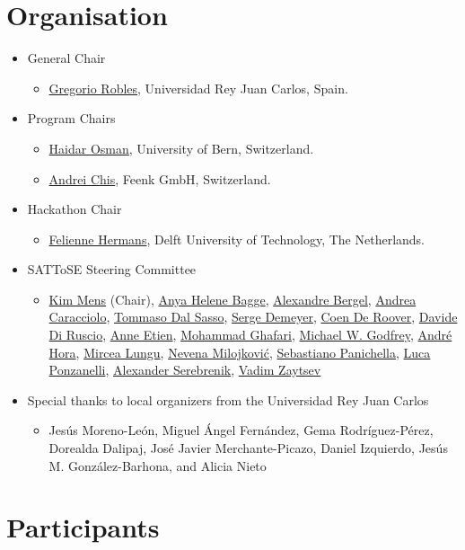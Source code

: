 \documentclass[12pt]{article}
\begin{document}
\section*{Organisation}
\begin{itemize}
 \item General Chair
 \begin{itemize}
  \item \href{https://gsyc.urjc.es/~grex/}{Gregorio Robles}, Universidad Rey Juan Carlos, Spain.
 \end{itemize}
 \item Program Chairs
 \begin{itemize}
  \item \href{http://scg.unibe.ch/staff/osman}{Haidar Osman}, University of Bern, Switzerland.
  \item \href{http://scg.unibe.ch/staff/andreichis}{Andrei Chis}, Feenk GmbH, Switzerland.
 \end{itemize}
 \item Hackathon Chair
 \begin{itemize}
  \item \href{http://www.felienne.com/}{Felienne Hermans}, Delft University of Technology, The Netherlands.
 \end{itemize}
 \item SATToSE Steering Committee
 \begin{itemize}
  \item \href{https://released.info.ucl.ac.be/Members/KimMens}{Kim Mens} (Chair), \href{http://www.ii.uib.no/~anya/}{Anya Helene Bagge}, \href{http://bergel.eu/}{Alexandre Bergel}, \href{https://caracciolo.github.io/}{Andrea Caracciolo}, \href{http://www.inf.usi.ch/phd/dalsat/index.php}{Tommaso Dal Sasso}, \href{http://win.ua.ac.be/~sdemey/}{Serge Demeyer}, \href{http://prog.vub.ac.be/~cderoove}{Coen De Roover}, \href{http://www.di.univaq.it/diruscio/}{Davide Di Ruscio}, \href{http://www.lifl.fr/~etien}{Anne Etien}, \href{http://scg.unibe.ch/staff/Mohammad-Ghafari}{Mohammad Ghafari}, \href{http://plg.uwaterloo.ca/~migod/}{Michael W. Godfrey}, \href{https://sites.google.com/site/andrehoraa/}{André Hora}, \href{https://mircealungu.github.io/}{Mircea Lungu}, \href{http://scg.unibe.ch/staff/Milojkovic}{Nevena Milojković}, \href{http://www.ifi.uzh.ch/en/seal/people/panichella.html}{Sebastiano Panichella}, \href{http://www.inf.usi.ch/phd/ponzanelli/}{Luca Ponzanelli}, \href{http://www.win.tue.nl/~aserebre/}{Alexander Serebrenik}, \href{http://grammarware.net/}{Vadim Zaytsev}
 \end{itemize}
  \item Special thanks to local organizers from the Universidad Rey Juan Carlos
  \begin{itemize}
   \item Jesús Moreno-León, Miguel Ángel Fernández, Gema Rodríguez-Pérez, Dorealda Dalipaj, José Javier Merchante-Picazo, Daniel Izquierdo, Jesús M. González-Barhona, and Alicia Nieto
  \end{itemize}
\end{itemize}

\section*{Participants}


\end{document}
